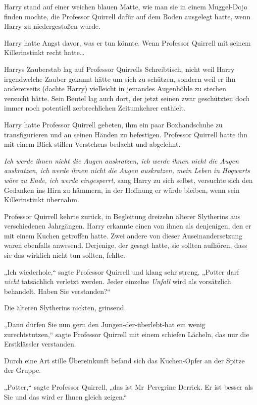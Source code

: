 {Harry stand auf einer weichen blauen Matte, wie man sie in einem Muggel-Dojo finden mochte, die Professor Quirrell dafür auf dem Boden ausgelegt hatte, wenn Harry zu niedergestoßen wurde.

Harry hatte Angst davor, was er tun könnte. Wenn Professor Quirrell mit seinem Killerinstinkt recht hatte…

Harrys Zauberstab lag auf Professor Quirrells Schreibtisch, nicht weil Harry irgendwelche Zauber gekannt hätte um sich zu schützen, sondern weil er ihn andererseits (dachte Harry) vielleicht in jemandes Augenhöhle zu stechen versucht hätte. Sein Beutel lag auch dort, der jetzt seinen zwar geschützten doch immer noch potentiell zerbrechlichen Zeitumkehrer enthielt.

Harry hatte Professor Quirrell gebeten, ihm ein paar Boxhandschuhe zu transfigurieren und an seinen Händen zu befestigen. Professor Quirrell hatte ihn mit einem Blick stillen Verstehens bedacht und abgelehnt.

\emph{Ich werde ihnen nicht die Augen auskratzen, ich werde ihnen nicht die Augen auskratzen, ich werde ihnen nicht die Augen auskratzen, mein Leben in Hogwarts wäre zu Ende, ich werde eingesperrt,} sang Harry zu sich selbst, versuchte sich den Gedanken ins Hirn zu hämmern, in der Hoffnung er würde bleiben, wenn sein Killerinstinkt übernahm.

Professor Quirrell kehrte zurück, in Begleitung dreizehn älterer Slytherins aus verschiedenen Jahrgängen. Harry erkannte einen von ihnen als denjenigen, den er mit einem Kuchen getroffen hatte. Zwei andere von dieser Auseinandersetzung waren ebenfalls anwesend. Derjenige, der gesagt hatte, sie sollten aufhören, dass sie das wirklich nicht tun sollten, fehlte.

„Ich wiederhole,“ sagte Professor Quirrell und klang sehr streng, „Potter darf \emph{nicht} tatsächlich verletzt werden. Jeder einzelne \emph{Unfall} wird als vorsätzlich behandelt. Haben Sie verstanden?“

Die älteren Slytherins nickten, grinsend.

„Dann dürfen Sie nun gern den Jungen-der-überlebt-hat ein wenig zurechtstutzen,“ sagte Professor Quirrell mit einem schiefen Lächeln, das nur die Erstklässler verstanden.

Durch eine Art stille Übereinkunft befand sich das Kuchen-Opfer an der Spitze der Gruppe.

„Potter,“ sagte Professor Quirrell, „das ist Mr~Peregrine Derrick. Er ist besser als Sie und das wird er Ihnen gleich zeigen.“

}
